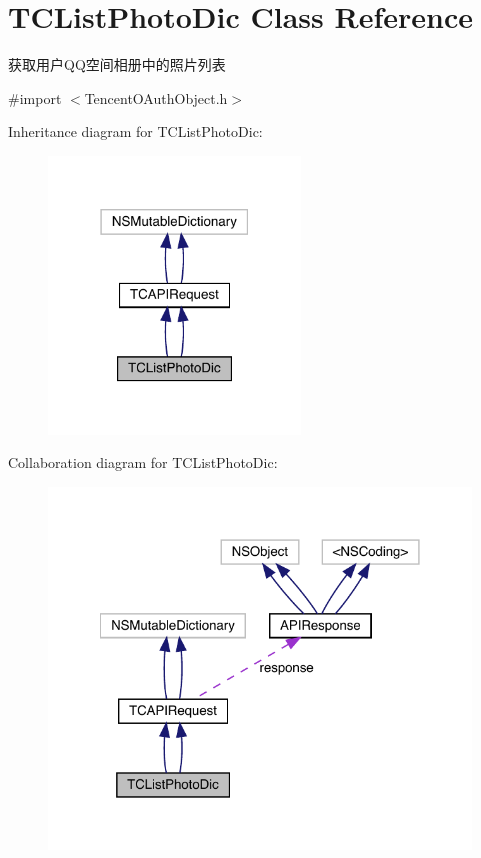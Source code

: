 \hypertarget{interface_t_c_list_photo_dic}{}\section{T\+C\+List\+Photo\+Dic Class Reference}
\label{interface_t_c_list_photo_dic}


获取用户\+Q\+Q空间相册中的照片列表  




{\ttfamily \#import $<$Tencent\+O\+Auth\+Object.\+h$>$}



Inheritance diagram for T\+C\+List\+Photo\+Dic\+:\nopagebreak
\begin{figure}[H]
\begin{center}
\leavevmode
\includegraphics[width=190pt]{interface_t_c_list_photo_dic__inherit__graph}
\end{center}
\end{figure}


Collaboration diagram for T\+C\+List\+Photo\+Dic\+:\nopagebreak
\begin{figure}[H]
\begin{center}
\leavevmode
\includegraphics[width=322pt]{interface_t_c_list_photo_dic__coll__graph}
\end{center}
\end{figure}
